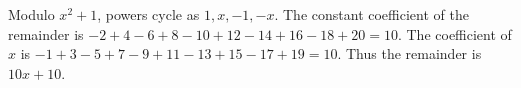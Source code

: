 Modulo $x^2+1$, powers cycle as $1,x,-1,-x$. The constant coefficient of the remainder is $-2+4-6+8-10+12-14+16-18+20=10$. The coefficient of $x$ is $-1+3-5+7-9+11-13+15-17+19=10$. Thus the remainder is $\boxed{10x+10}$.
